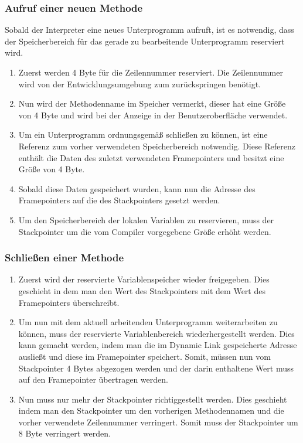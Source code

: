\subsubsection{Aufruf einer neuen Methode}
\label{sec:memoryframe_open}
Sobald der Interpreter eine neues Unterprogramm aufruft, ist es notwendig, dass der Speicherbereich für das gerade zu bearbeitende Unterprogramm reserviert wird.
\begin{enumerate}
 \item Zuerst werden 4 Byte für die Zeilennummer reserviert. Die Zeilennummer wird von der Entwicklungsumgebung zum zurückspringen benötigt.
 \item Nun wird der Methodenname im Speicher vermerkt, dieser hat eine Größe von 4 Byte und wird bei der Anzeige in der Benutzeroberfläche verwendet.
 \item Um ein Unterprogramm ordnungsgemäß schließen zu können, ist eine Referenz zum vorher verwendeten Speicherbereich notwendig. Diese Referenz enthält die Daten des zuletzt verwendeten Framepointers und besitzt eine Größe von 4 Byte.
 \item Sobald diese Daten gespeichert wurden, kann nun die Adresse des Framepointers auf die des Stackpointers gesetzt werden.
 \item Um den Speicherbereich der lokalen Variablen zu reservieren, muss der Stackpointer um die vom Compiler vorgegebene Größe erhöht werden.
\end{enumerate}
 
\subsubsection{Schließen einer Methode}
\begin{enumerate}
 \item Zuerst wird der reservierte Variablenspeicher wieder freigegeben. Dies geschieht in dem man den Wert des Stackpointers mit dem Wert des Framepointers überschreibt.
 \item Um nun mit dem aktuell arbeitenden Unterprogramm weiterarbeiten zu können, muss der reservierte Variablenbereich wiederhergestellt werden. Dies kann gemacht werden, indem man die im Dynamic Link gespeicherte Adresse ausließt und diese im Framepointer speichert. Somit, müssen nun vom Stackpointer 4 Bytes abgezogen werden und der darin enthaltene Wert muss auf den Framepointer übertragen werden.
 \item Nun muss nur mehr der Stackpointer richtiggestellt werden. Dies geschieht indem man den Stackpointer um den vorherigen Methodennamen und die vorher verwendete Zeilennummer verringert. Somit muss der Stackpointer um 8 Byte verringert werden.
\end{enumerate}

